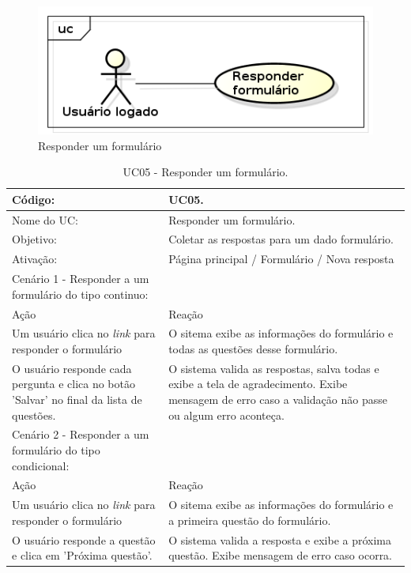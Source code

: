 \documentclass[11pt]{article}
\begin{document}
        \begin{figure}[h!]
          \centering
          \includegraphics[width=.5\textwidth]{responder.png}
          \caption{Responder um formulário}
        \end{figure}

        \begin{table}[h]
          \begin{center}
            \begin{tabular}{ | p{7cm} | p{8cm} | }
              \hline
              Código: \cellcolor{gray} & UC05. \\
              \hline
              Nome do UC: \cellcolor{gray} & Responder um formulário. \\
              \hline
              Objetivo: \cellcolor{gray} & Coletar as respostas para um dado formulário. \\
              \hline
              Ativação: \cellcolor{gray} & Página principal / Formulário / Nova resposta \\
              \hline
              \hline
              Cenário 1 - Responder a um formulário do tipo continuo: &  \\
              \hline
              Ação\cellcolor{gray} & Reação\cellcolor{gray} \\
              \hline
              Um usuário clica no {\em link} para responder o formulário & O sitema exibe as informações do formulário e todas as questões desse formulário. \\
              \hline
              O usuário responde cada pergunta e clica no botão 'Salvar' no final da lista de questões. & O sistema valida as respostas, salva todas e exibe a tela de agradecimento. Exibe mensagem de erro caso a validação não passe ou algum erro aconteça. \\
              \hline
              \hline              
              Cenário 2 - Responder a um formulário do tipo condicional: &  \\
              \hline
              Ação\cellcolor{gray} & Reação\cellcolor{gray} \\
              \hline
              Um usuário clica no {\em link} para responder o formulário & O sitema exibe as informações do formulário e a primeira questão do formulário. \\
              \hline
              O usuário responde a questão e clica em 'Próxima questão'. & O sistema valida a resposta e exibe a próxima questão. Exibe mensagem de erro caso ocorra. \\
              \hline
            \end{tabular}
            \caption{UC05 - Responder um formulário.}
          \end{center}
        \end{table}
\end{document}

